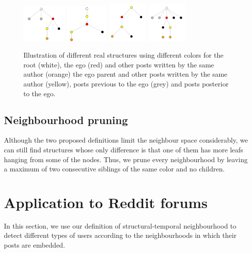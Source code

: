 \documentclass[conference]{IEEEtran}
\begin{document}
\begin{figure}
\centering
\includegraphics[width=0.2\textwidth]{neighbourhood_time_342}
\includegraphics[width=0.19\textwidth]{neighbourhood_time_456}
\includegraphics[width=0.18\textwidth]{neighbourhood_time_501}
\includegraphics[width=0.18\textwidth]{neighbourhood_time_524}
\caption{Illustration of different real structures using different colors for the root (white), the ego (red) and other posts written by the same author (orange) the ego parent and other posts written by the same author (yellow), posts previous to the ego (grey) and posts posterior to the ego.}
\label{fig:cutpoints}
\end{figure}

\subsection{Neighbourhood pruning}\label{sec:pruning}
Although the two proposed definitions limit the neighbour space considerably, we can still find structures whose only difference is that one of them has more leafs hanging from some of the nodes. Thus, we prune every neighbourhood by leaving a maximum of two consecutive siblings of the same color and no children.

\section{Application to Reddit forums}
In this section, we use our definition of structural-temporal neighbourhood to detect different types of users according to the neighbourhoods in which their posts are embedded.
\end{document}
